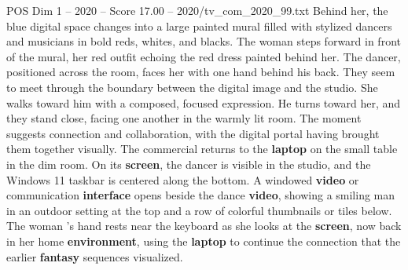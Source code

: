 \begin{textsample}{POS Dim 1 – 2020 – Score 17.00 – 2020/tv\_com\_2020\_99.txt}
Behind her, the blue digital space changes into a large painted mural filled with stylized dancers and musicians in bold reds, whites, and blacks.
The woman steps forward in front of the mural, her red outfit echoing the red dress painted behind her.
The dancer, positioned across the room, faces her with one hand behind his back.
They seem to meet through the boundary between the digital image and the studio.
She walks toward him with a composed, focused expression.
He turns toward her, and they stand close, facing one another in the warmly lit room.
The moment suggests connection and collaboration, with the digital portal having brought them together visually.
The commercial returns to the \textbf{laptop} on the small table in the dim room.
On its \textbf{screen}, the dancer is visible in the studio, and the Windows 11 taskbar is centered along the bottom.
A windowed \textbf{video} or communication \textbf{interface} opens beside the dance \textbf{video}, showing a smiling man in an outdoor setting at the top and a row of colorful thumbnails or tiles below.
The woman ’s hand rests near the keyboard as she looks at the \textbf{screen}, now back in her home \textbf{environment}, using the \textbf{laptop} to continue the connection that the earlier \textbf{fantasy} sequences visualized.

\end{textsample}
